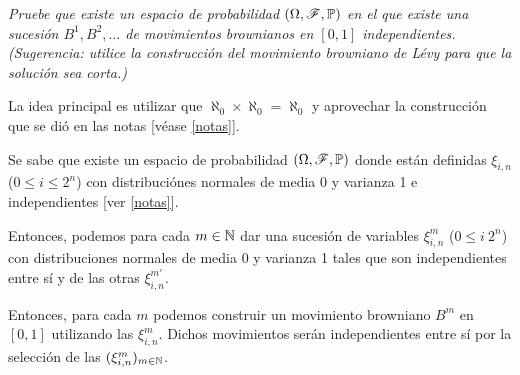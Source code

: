 \emph{
    Pruebe que existe un espacio de probabilidad $ \left(  \Omega ,\mathscr{F} , \mathbb{P}  \right)  $ en el que existe 
    una sucesi\'on $B^1,B^2,\ldots$ de movimientos brownianos en $[0,1]$ 
    independientes. (Sugerencia: utilice la construcci\'on del movimiento 
    browniano de L\'evy  para que la soluci\'on sea corta.)
}
\afterstatement\pn

La idea principal es utilizar que $\aleph_0 \times \aleph_0 = \aleph_0$ y aprovechar
la construcción que se dió en las notas [véase \ref{notas}].\pn

Se sabe que existe un espacio de probabilidad $(\Omega, \mathscr{F}, \mathbb{P})$ donde están
definidas $\xi_{i,n}$ ($0 \leq i \leq 2^n$) con distribuciónes normales de media 0 y 
varianza 1 e independientes [ver \ref{notas}].\pn

Entonces, podemos para cada $m \in \mathbb{N}$ dar una sucesión de variables $\xi_{i,n}^m$
($0 \leq i \ 2^n$) con distribuciones normales de media 0 y varianza 1 tales que
son independientes entre sí y de las otras $\xi_{i,n}^{m'}$.\pn

Entonces, para cada $m$ podemos construir un movimiento browniano $B^m$ en $[0, 1]$ utilizando
las $\xi_{i,n}^m$. Dichos movimientos serán independientes entre sí por la selección
de las $(\xi_{i,n}^m)_{m \in \mathbb{N}}$.